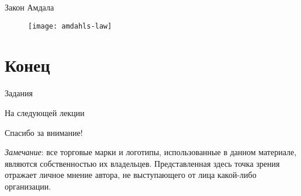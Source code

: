 \begin{frame}{Закон Амдала}
\begin{figure}
    \centering
    \texttt{[image: amdahls-law]}
\end{figure}
\end{frame}

\section*{Конец}

\begin{frame}{Задания}
\end{frame}

\begin{frame}{На следующей лекции}
\end{frame}

\begin{frame}

{\huge{Спасибо за внимание!}\par}

\vfill

\tiny{\textit{Замечание}: все торговые марки и логотипы, использованные в данном материале, являются собственностью их владельцев. Представленная здесь точка зрения отражает личное мнение автора, не выступающего от лица какой-либо организации.}

\end{frame}


